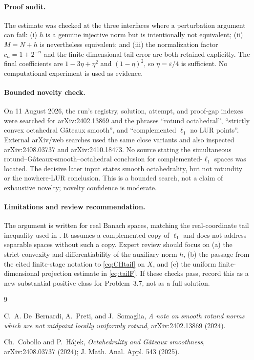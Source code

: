 \documentclass[11pt]{article}
\newcommand{\eps}{\varepsilon}
\begin{document}
\paragraph{Proof audit.}
The estimate was checked at the three interfaces where a perturbation argument
can fail: (i) $h$ is a genuine injective norm but is intentionally not
equivalent; (ii) $M=N+h$ is nevertheless equivalent; and (iii) the
normalization factor $c_n=1+2^{-n}$ and the finite-dimensional tail error are
both retained explicitly.  The final coefficients are
$1-3\eta+\eta^2$ and $(1-\eta)^2$, so $\eta=\eps/4$ is sufficient.  No
computational experiment is used as evidence.

\paragraph{Bounded novelty check.}
On 11 August 2026, the run's registry, solution, attempt, and proof-gap indexes
were searched for arXiv:2402.13869 and the phrases
``rotund octahedral'', ``strictly convex octahedral G\^ateaux smooth'', and
``complemented $\ell_1$ no LUR points''.  External arXiv/web searches used the
same close variants and also inspected arXiv:2408.03737 and arXiv:2410.18473.
No source stating the simultaneous rotund--G\^ateaux-smooth--octahedral
conclusion for complemented-$\ell_1$ spaces was located.  The decisive later
input \cite{CH} states smooth octahedrality, but not rotundity or the
nowhere-LUR conclusion.  This is a bounded search, not a claim of exhaustive
novelty; novelty confidence is moderate.

\paragraph{Limitations and review recommendation.}
The argument is written for real Banach spaces, matching the real-coordinate
tail inequality used in \cite{CH}.  It assumes a complemented copy of
$\ell_1$ and does not address separable spaces without such a copy.  Expert
review should focus on (a) the strict convexity and differentiability of the
auxiliary norm $h$, (b) the passage from the cited finite-stage notation to
\eqref{eq:CHtail} on $X$, and (c) the uniform finite-dimensional projection
estimate in \eqref{eq:tailF}.  If these checks pass, record this as a new
substantial positive class for Problem~3.7, not as a full solution.

\begin{thebibliography}{9}

C.~A. De~Bernardi, A.~Preti, and J.~Somaglia,
\emph{A note on smooth rotund norms which are not midpoint locally uniformly
rotund}, arXiv:2402.13869 (2024).

Ch.~Cobollo and P.~H\'ajek,
\emph{Octahedrality and G\^ateaux smoothness},
arXiv:2408.03737 (2024); J. Math. Anal. Appl. 543 (2025).

\end{thebibliography}
\end{document}
